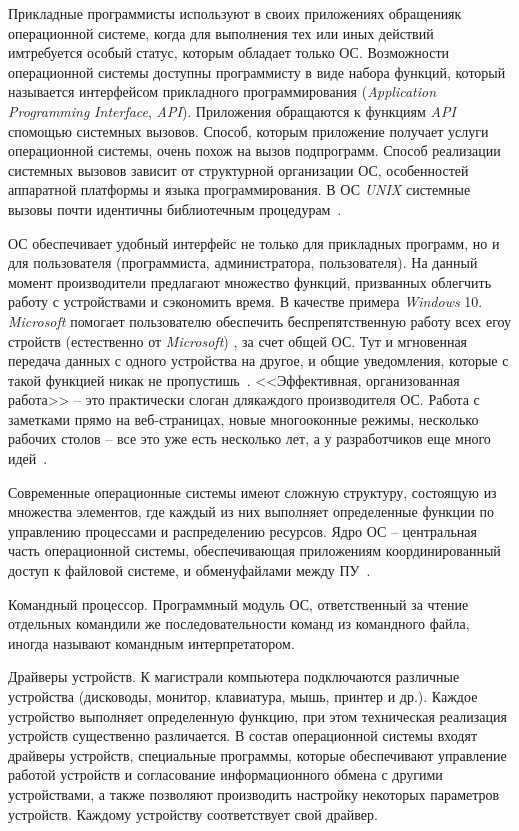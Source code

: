 Прикладные программисты используют в своих приложениях обращенияк операционной системе, когда для выполнения тех или иных действий имтребуется   особый   статус,   которым   обладает   только   ОС.   Возможности операционной   системы   доступны   программисту   в   виде   набора   функций, который называется интерфейсом прикладного программирования (\textit{Application Programming}   \textit{Interface},  \textit{API}).   Приложения   обращаются   к   функциям   \textit{API}   спомощью системных вызовов. Способ, которым приложение получает услуги операционной   системы,   очень   похож   на   вызов   подпрограмм.   Способ реализации   системных   вызовов   зависит   от   структурной   организации   ОС, особенностей аппаратной платформы и языка программирования. В ОС \textit{UNIX} системные вызовы почти идентичны библиотечным процедурам~\cite{Oc1}.

ОС   обеспечивает   удобный   интерфейс   не   только   для   прикладных программ,   но   и   для   пользователя   (программиста,   администратора, пользователя). На данный момент производители предлагают множество функций, призванных облегчить работу с устройствами и сэкономить время. В качестве примера \textit{Windows}  10.  \textit{Microsoft} помогает   пользователю   обеспечить   беспрепятственную   работу   всех   егоу стройств (естественно от  \textit{Microsoft}) , за счет общей ОС. Тут и мгновенная передача данных с одного устройства на другое, и общие уведомления, которые с такой функцией никак не пропустишь~\cite{linuxOffDoc}. <<Эффективная, организованная работа>>  – это практически слоган длякаждого производителя ОС. Работа с заметками прямо на веб-страницах, новые многооконные режимы, несколько рабочих столов – все это уже есть несколько лет, а у разработчиков еще много идей~\cite{linuxOffDoc}.

Современные   операционные   системы   имеют   сложную   структуру, состоящую   из   множества   элементов,   где   каждый   из   них   выполняет определенные функции по управлению процессами и распределению ресурсов.
Ядро ОС – центральная часть операционной системы, обеспечивающая приложениям   координированный   доступ   к   файловой   системе,   и   обменуфайлами между ПУ~\cite{Oc2}.

Командный процессор. Программный модуль ОС, ответственный за чтение отдельных командили же последовательности команд из командного файла, иногда называют командным интерпретатором.

Драйверы устройств. К магистрали  компьютера подключаются различные устройства (дисководы,   монитор,   клавиатура,   мышь,   принтер   и   др.).   Каждое устройство выполняет определенную функцию, при этом техническая реализация устройств существенно различается. В состав операционной системы входят драйверы устройств, специальные программы, которые обеспечивают   управление   работой   устройств   и   согласование информационного обмена с другими устройствами, а также позволяют производить   настройку   некоторых   параметров   устройств.   Каждому устройству соответствует свой драйвер.

